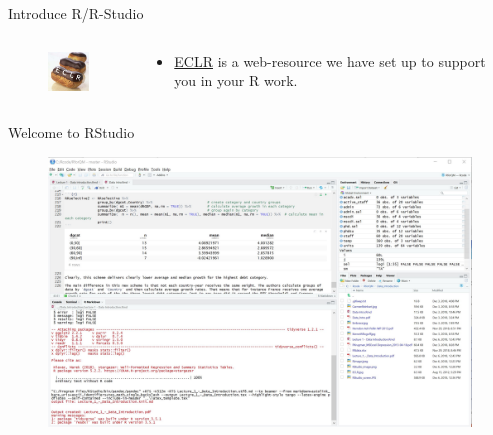 \documentclass[
  ignorenonframetext,
]{beamer}
\begin{document}
\begin{frame}{Introduce R/R-Studio}
\begin{columns}
\begin{column}{0.8\textwidth}
  \end{column}
    
\end{columns}

\begin{columns}
  
  \begin{column}{0.2\textwidth}
    \begin{figure}
        \centering
        \includegraphics[width=2cm]{ECLR.jpg}\\
    \end{figure}

  \end{column}
  \begin{column}{0.8\textwidth}
    \begin{itemize}
      \item \href{https://datasquad.github.io/ECLR/}{ECLR} is a web-resource we have set up to support you in your R work. 
    \end{itemize}
    
  \end{column}
    
\end{columns}
\end{frame}

\begin{frame}{Welcome to RStudio}
\label{welcome-to-rstudio}
\begin{figure}
    \centering
    \includegraphics[width=12cm]{RStudio_screen.jpg}\\
\end{figure}
\end{frame}
\end{document}
